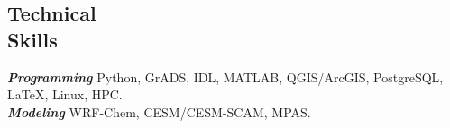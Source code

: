 \documentclass[margin,line]{resume}
\begin{document}
\begin{resume}
			
			\vspace{-0.4cm}
			
			\section{\mysidestyle \textbf{\textcolor{sep}{Technical \\Skills}}}
			
			\textbf{\emph{\textcolor{sep}{Programming}}} \hspace{1mm} Python, GrADS, IDL, MATLAB, QGIS/ArcGIS, PostgreSQL,  \LaTeX, Linux, HPC.\\
			\textbf{\emph{\textcolor{sep}{Modeling}}} \hspace{8mm} WRF-Chem, CESM/CESM-SCAM, MPAS.  
			
			

\end{resume}
\end{document}
